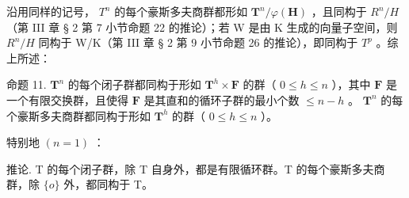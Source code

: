 沿用同样的记号， \(T^{n}\) 的每个豪斯多夫商群都形如 \(\mathbf{T}^{n}/\varphi(\mathbf{H})\) ，且同构于 \(R^{n}/H\) （第 III 章 § 2 第 7 小节命题 22 的推论）；若 W 是由 K 生成的向量子空间，则 \(R^{n}/H\) 同构于 W/K（第 III 章 § 2 第 9 小节命题 26 的推论），即同构于 \(T^{p}\) 。综上所述：

命题 11. \(\mathbf{T}^n\) 的每个闭子群都同构于形如 \(\mathbf{T}^h \times \mathbf{F}\) 的群（ \(0 \leqslant h \leqslant n\) ），其中 \(\mathbf{F}\) 是一个有限交换群，且使得 \(\mathbf{F}\) 是其直和的循环子群的最小个数 \(\leqslant n - h\) 。 \(\mathbf{T}^n\) 的每个豪斯多夫商群都同构于形如 \(\mathbf{T}^h\) 的群（ \(0 \leqslant h \leqslant n\) ）。

特别地 \((n = 1)\) ：

推论. T 的每个闭子群，除 T 自身外，都是有限循环群。T 的每个豪斯多夫商群，除 \(\{o\}\) 外，都同构于 T。

